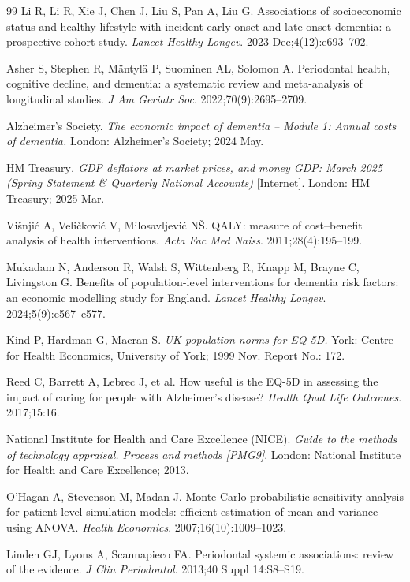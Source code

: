 \documentclass[11pt,a4paper]{article}
\begin{document}
\begin{thebibliography}{99}
 Li R, Li R, Xie J, Chen J, Liu S, Pan A, Liu G. Associations of socioeconomic status and healthy lifestyle with incident early-onset and late-onset dementia: a prospective cohort study. \textit{Lancet Healthy Longev}. 2023 Dec;4(12):e693--702.

 Asher S, Stephen R, Mäntylä P, Suominen AL, Solomon A. Periodontal health, cognitive decline, and dementia: a systematic review and meta-analysis of longitudinal studies. \textit{J Am Geriatr Soc}. 2022;70(9):2695--2709.

 Alzheimer's Society. \textit{The economic impact of dementia -- Module 1: Annual costs of dementia.} London: Alzheimer's Society; 2024 May.

 HM Treasury\textit{. GDP deflators at market prices, and money GDP: March 2025 (Spring Statement \& Quarterly National Accounts)} [Internet]. London: HM Treasury; 2025 Mar.

 Višnjić A, Veličković V, Milosavljević NŠ. QALY: measure of cost--benefit analysis of health interventions. \textit{Acta Fac Med Naiss}. 2011;28(4):195--199.

 Mukadam N, Anderson R, Walsh S, Wittenberg R, Knapp M, Brayne C, Livingston G. Benefits of population-level interventions for dementia risk factors: an economic modelling study for England. \textit{Lancet Healthy Longev}. 2024;5(9):e567--e577.

 Kind P, Hardman G, Macran S. \textit{UK population norms for EQ-5D.} York: Centre for Health Economics, University of York; 1999 Nov. Report No.: 172.

 Reed C, Barrett A, Lebrec J, et al. How useful is the EQ-5D in assessing the impact of caring for people with Alzheimer's disease? \textit{Health Qual Life Outcomes}. 2017;15:16.

 National Institute for Health and Care Excellence (NICE). \textit{Guide to the methods of technology appraisal. Process and methods [PMG9]}. London: National Institute for Health and Care Excellence; 2013.

 O'Hagan A, Stevenson M, Madan J. Monte Carlo probabilistic sensitivity analysis for patient level simulation models: efficient estimation of mean and variance using ANOVA. \textit{Health Economics}. 2007;16(10):1009--1023.

 Linden GJ, Lyons A, Scannapieco FA. Periodontal systemic associations: review of the evidence. \textit{J Clin Periodontol}. 2013;40 Suppl 14:S8--S19.


\end{thebibliography}
\end{document}
